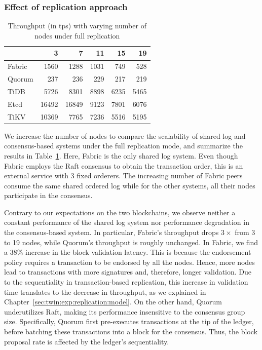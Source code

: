 \subsubsection{Effect of replication approach}
\label{sec:twin:exp:replication:approach}

\begin{table}[tp]
    \centering
    \caption{Throughput (in tps) with varying number of nodes under full replication}
    \begin{tabular}{@{}lrrrrr@{}}
    \toprule
    \textbf{} & \textbf{3} & \textbf{7} & \textbf{11} & \textbf{15} & \textbf{19} \\ \midrule
    Fabric             & 1560        & 1288        & 1031         & 749         & 528         \\
    Quorum             & 237        & 236        & 229         & 217         & 219         \\
    TiDB               & 5726       & 8301       & 8898        & 6235        & 5465        \\
    Etcd               & 16492      & 16849      & 9123        & 7801        & 6076        \\ 
	TiKV               & 10369       & 7765       & 7236        & 5516        & 5195        \\
	\bottomrule
    \end{tabular}
    \label{tab:twin:scale}
\end{table}

We increase the number of nodes to compare the scalability of shared log and
consensus-based systems under the full replication mode, and summarize the
results in Table~\ref{tab:twin:scale}.
Here, Fabric is the only shared log system.
Even though Fabric employs the Raft consensus to obtain the transaction order,
this is an external service with 3 fixed orderers. 
The increasing number of Fabric peers consume the same shared ordered log while for the other systems, all their nodes participate in the consensus.

Contrary to our expectations on the two blockchains, we observe neither a constant performance of the
shared log system nor performance degradation in the consensus-based system.
In particular, Fabric's throughput drops $3\times$ from 3 to 19 nodes, while
Quorum's throughput is roughly unchanged.
In Fabric, we find a $38\%$ increase in the block validation latency.
This is because the endorsement policy requires a transaction to be endorsed by
all the nodes.
Hence, more nodes lead to transactions with more signatures and, therefore,
longer validation.
Due to the sequentiality in transaction-based replication, this increase in
validation time translates to the decrease in throughput, as we explained in
Chapter~\ref{sec:twin:exp:replication:model}.
On the other hand, Quorum underutilizes Raft, making its performance insensitive
to the consensus group size.
Specifically, Quorum first pre-executes transactions at the tip of the ledger,
before batching these transactions into a block for the consensus.
Thus, the block proposal rate is affected by the ledger's sequentiality.

